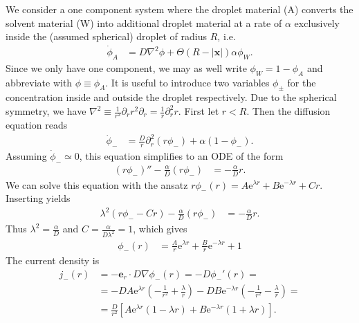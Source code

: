 \documentclass[english, parskip=full]{scrartcl}
\title{\titel}
\author{\autor}
\date{\today}
\newcommand{\kla}{}
\newcommand{\klam}{}
\newcommand{\e}{\text{e}}
\begin{document}
\maketitle  %

We consider a one component system where the droplet material (A) converts the solvent material (W) into additional droplet material at a rate of $\alpha$ exclusively inside the (assumed spherical) droplet of radius $R$, i.e.
\begin{align}
\dot{\phi}_A &= D\nabla^2\phi + \Theta (R - |\textbf{x}|) \alpha \phi_W.
\end{align}
Since we only have one component, we may as well write $\phi_W = 1 - \phi_A$ and abbreviate with $\phi\equiv \phi_A$.
It is useful to introduce two variables $\phi_\pm$ for the concentration inside and outside the droplet respectively.
Due to the spherical symmetry, we have $\nabla^2 \equiv \frac{1}{r^2}\partial_r r^2\partial_r = \frac{1}{r} \partial_r^2 r$.
First let $r<R$.
Then the diffusion equation reads
\begin{align}
\dot{\phi}_- &= \frac{D}{r}\partial_r^2(r\phi_-) + \alpha (1 - \phi_-).
\end{align}
Assuming $\dot{\phi}_- \simeq 0$, this equation simplifies to an ODE of the form
\begin{align}
(r\phi_-)'' - \frac{\alpha}{D}(r\phi_-) &= -\frac{\alpha}{D}r.
\end{align} 
We can solve this equation with the ansatz $r\phi_-(r) = A\e^{\lambda r} + B\e^{-\lambda r} + Cr$.
Inserting yields
\begin{align}
\lambda^2 (r\phi_- - Cr) - \frac{\alpha}{D}(r\phi_-) &= -\frac{\alpha}{D}r.
\end{align}
Thus  $\lambda^2 = \frac{\alpha}{D}$ and $C=\frac{\alpha}{D\lambda^2}= 1$, which gives
\begin{align}
\phi_-(r) &= \frac{A}{r}\e^{\lambda r} + \frac{B}{r}\e^{-\lambda r} + 1
\end{align}
The current density is 
\begin{align}
j_-(r) &= -\textbf{e}_r\cdot D\nabla \phi_-(r) = -D\phi_-'(r) = \\
&= -DA\e^{\lambda r} \kla\left( -\frac{1}{r^2} + \frac{\lambda}{r} \right) - DB\e^{-\lambda r} \kla\left( -\frac{1}{r^2} - \frac{\lambda}{r} \right) = \\
&= \frac{D}{r^2} \klam\left[ A\e^{\lambda r} \kla\left( 1 - \lambda r \right) + B\e^{-\lambda r} \kla\left( 1 + \lambda r \right) \right].
\end{align}
\end{document}
